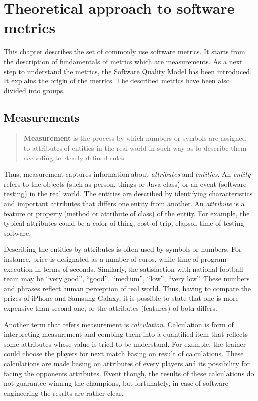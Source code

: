 \chapter{Theoretical approach to software metrics} \label{roz:metrics_theory}

This chapter describes the set of commonly use software metrics. It starts from the description of fundamentals of metrics which are measurements. As a next step to understand the metrics, the Software Quality Model has been introduced. It explains the origin of the metrics. The described metrics have been also divided into groups. 

\section{Measurements}

\begin{quote}
\textbf{Measurement} is the process by which numbers or symbols are assigned to attributes of entities in the real world in such way as to describe them according to clearly defined rules \cite{rigorous}.
\end{quote}

Thus, measurement captures information about \textit{attributes} and \textit{entities}. An \textit{entity} refers to the objects (such as person, things or Java class) or an event (software testing) in the real world. The entities are described by identifying characteristics and important attributes that differs one entity from another. An \textit{attribute} is a feature or property (method or attribute of class) of the entity. For example, the typical attributes could be a color of thing, cost of trip, elapsed time of testing software.  

Describing the entities by attributes is often used by symbols or numbers. For instance, price is designated as a number of euros, while time of program execution in terms of seconds. Similarly, the satisfaction with national football team  may be ``very good'', ``good'', ``medium'', ``low'', ``very low''. These numbers and phrases reflect human perception of real world. Thus, having to compare the prizes of iPhone and Samsung Galaxy, it is possible to state that one is more expensive than second one, or the attributes (features) of both differs. 

Another term that refers measurement is \textit{calculation}. Calculation is form of interpreting measurement and combing them into a quantified item that reflects some attributes whose value is tried to be understand. For example, the trainer could choose the players for next match basing on result of calculations. These calculations are made basing on attributes of every players and its possibility for facing the opponents attributes. Event though, the results of these calculations do not guarantee winning the champions, but fortunately, in case of software engineering the results are rather clear.   

